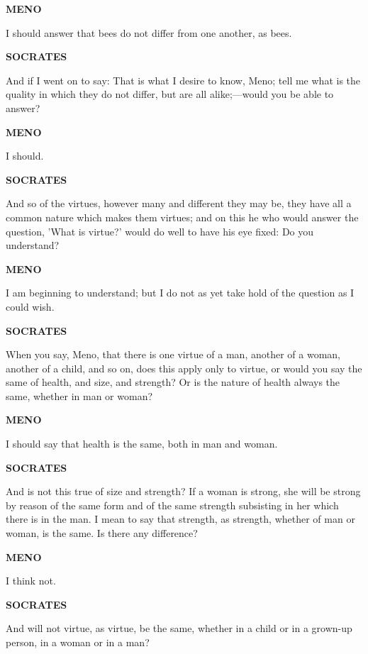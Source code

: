 \documentclass[11pt,letter]{article}
\begin{document}
\par \textbf{MENO}
\par   I should answer that bees do not differ from one another, as bees.

\par \textbf{SOCRATES}
\par   And if I went on to say:  That is what I desire to know, Meno; tell me what is the quality in which they do not differ, but are all alike;—would you be able to answer?

\par \textbf{MENO}
\par   I should.

\par \textbf{SOCRATES}
\par   And so of the virtues, however many and different they may be, they have all a common nature which makes them virtues; and on this he who would answer the question, 'What is virtue?' would do well to have his eye fixed:  Do you understand?

\par \textbf{MENO}
\par   I am beginning to understand; but I do not as yet take hold of the question as I could wish.

\par \textbf{SOCRATES}
\par   When you say, Meno, that there is one virtue of a man, another of a woman, another of a child, and so on, does this apply only to virtue, or would you say the same of health, and size, and strength? Or is the nature of health always the same, whether in man or woman?

\par \textbf{MENO}
\par   I should say that health is the same, both in man and woman.

\par \textbf{SOCRATES}
\par   And is not this true of size and strength? If a woman is strong, she will be strong by reason of the same form and of the same strength subsisting in her which there is in the man. I mean to say that strength, as strength, whether of man or woman, is the same. Is there any difference?

\par \textbf{MENO}
\par   I think not.

\par \textbf{SOCRATES}
\par   And will not virtue, as virtue, be the same, whether in a child or in a grown-up person, in a woman or in a man?
\end{document}
